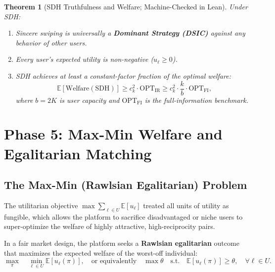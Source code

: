 \documentclass[11pt,letterpaper]{article}
\theoremstyle{definition}
\theoremstyle{plain}
\newtheorem{theorem}{Theorem}[section]
\theoremstyle{remark}
\begin{document}
\begin{theorem}[SDH Truthfulness and Welfare; Machine-Checked in Lean]
Under SDH:
\begin{enumerate}[leftmargin=2em]
    \item Sincere swiping is universally a \textbf{Dominant Strategy (DSIC)} against any behavior of other users.
    \item Every user's expected utility is non-negative ($u_\ell \ge 0$).
    \item SDH achieves at least a constant-factor fraction of the optimal welfare:
    \begin{equation}
        \mathbb{E}[\text{Welfare}(\text{SDH})] \ge c_k^2 \cdot \mathrm{OPT}_{\mathrm{IR}} \ge c_k^2 \cdot \frac{k}{b} \cdot \mathrm{OPT}_{\mathrm{FI}},
    \end{equation}
    where $b = 2K$ is user capacity and $\mathrm{OPT}_{\mathrm{FI}}$ is the full-information benchmark.
\end{enumerate}
\end{theorem}

\newpage
\section{Phase 5: Max-Min Welfare and Egalitarian Matching}
\label{sec:maxmin}

\subsection{The Max-Min (Rawlsian Egalitarian) Problem}
The utilitarian objective $\max \sum_{\ell \in U} \mathbb{E}[u_\ell]$ treated all units of utility as fungible, which allows the platform to sacrifice disadvantaged or niche users to super-optimize the welfare of highly attractive, high-reciprocity pairs.

In a fair market design, the platform seeks a \textbf{Rawlsian egalitarian} outcome that maximizes the expected welfare of the worst-off individual:
\begin{equation}
    \max_\pi \quad \min_{\ell \in U} \mathbb{E}[u_\ell(\pi)], \quad \text{or equivalently} \quad \max \theta \quad \text{s.t.} \quad \mathbb{E}[u_\ell(\pi)] \ge \theta, \quad \forall \ell \in U.
\end{equation}
\end{document}
